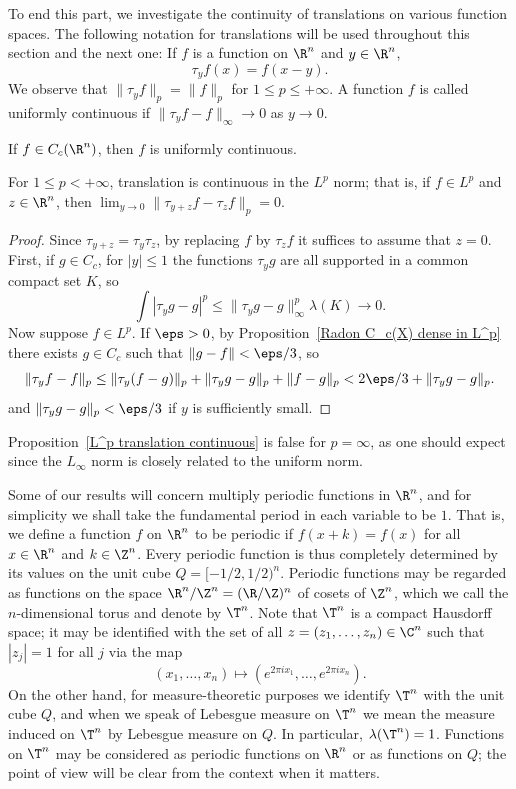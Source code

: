 To end this part, we investigate the continuity of translations on various function spaces. The following notation for translations will be used throughout this section and the next one: If $f$ is a function on $\R^n$ and $y\in\R^n$,
\[\tau_yf(x)=f(x-y).\]
We observe that $\|\tau_yf\|_p=\|f\|_p$ for $1\leq p\leq +\infty$. A function $f$ is called uniformly continuous if $\|\tau_yf-f\|_{\infty}\to 0$ as $y\to 0$.
\begin{lemma}
If $f\in C_c(\R^n)$, then $f$ is uniformly continuous.
\end{lemma}
\begin{proposition}\label{L^p translation continuous}
For $1\leq p<+\infty$, translation is continuous in the $L^p$ norm; that is, if $f\in L^p$ and $z\in\R^n$, then $\lim_{y\to 0}\|\tau_{y+z}f-\tau_zf\|_p=0$.
\end{proposition}
\begin{proof}
Since $\tau_{y+z}=\tau_y\tau_z$, by replacing $f$ by $\tau_zf$ it suffices to assume that $z=0$. First, if $g\in C_c$, for $|y|\leq 1$ the functions $\tau_yg$ are all supported in a common compact set $K$, so
\[\int|\tau_yg-g|^p\leq\|\tau_yg-g\|_{\infty}^p\lambda(K)\to 0.\]
Now suppose $f\in L^p$. If $\eps>0$, by Proposition~\ref{Radon C_c(X) dense in L^p} there exists $g\in C_c$ such that $\|g-f\|<\eps/3$, so
\[\|\tau_yf-f\|_p\leq\|\tau_y(f-g)\|_p+\|\tau_yg-g\|_p+\|f-g\|_p<2\eps/3+\|\tau_yg-g\|_p.\]
and $\|\tau_yg-g\|_p<\eps/3$ if $y$ is sufficiently small.
\end{proof}
Proposition~\ref{L^p translation continuous} is false for $p=\infty$, as one should expect since the $L_\infty$ norm is closely related to the uniform norm.\par
Some of our results will concern multiply periodic functions in $\R^n$, and for simplicity we shall take the fundamental period in each variable to be $1$. That is, we define a function $f$ on $\R^n$ to be periodic if $f(x+k)=f(x)$ for all $x\in\R^n$ and $k\in\Z^n$. Every periodic function is thus completely determined by its values on the unit cube $Q=[-1/2,1/2)^n$. Periodic functions may be regarded as functions on the space $\R^n/\Z^n=(\R/\Z)^n$ of cosets of $\Z^n$, which we call the $n$-dimensional torus and denote by $\T^n$. Note that $\T^n$ is a compact Hausdorff space; it may be identified with the set of all $z=(z_1,\dots,z_n)\in\C^n$ such that $|z_j|=1$ for all $j$ via the map
\[(x_1,\dots,x_n)\mapsto(e^{2\pi ix_1},\dots,e^{2\pi ix_n}).\]
On the other hand, for measure-theoretic purposes we identify $\T^n$ with the unit cube $Q$, and when we speak of Lebesgue measure on $\T^n$ we mean the measure induced on $\T^n$ by Lebesgue measure on $Q$. In particular, $\lambda(\T^n)=1$. Functions on $\T^n$ may be considered as periodic functions on $\R^n$ or as functions on $Q$; the point of view will be clear from the context when it matters.
